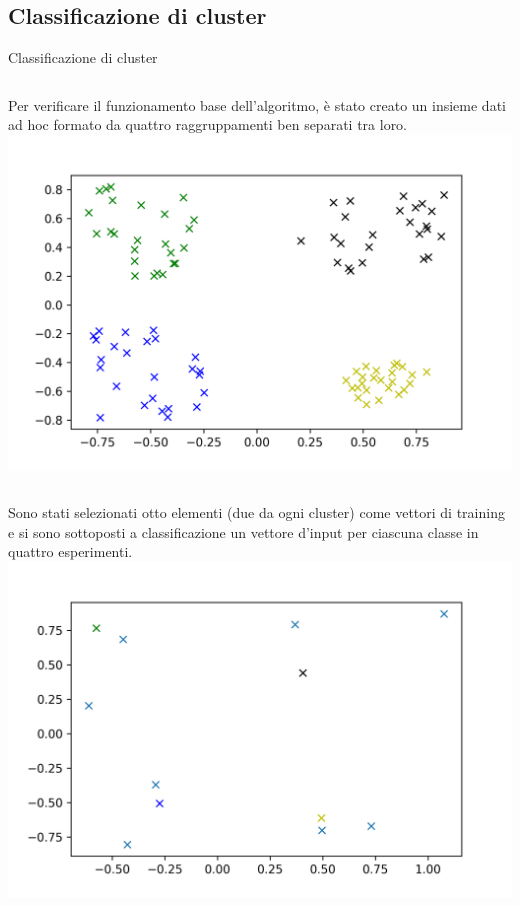 \documentclass{beamer}
\begin{document}
    \subsection{Classificazione di cluster}

    \begin{frame}{Classificazione di cluster}
        \begin{columns}
            Per verificare il funzionamento base dell'algoritmo, è stato creato un insieme dati ad hoc formato da quattro raggruppamenti ben separati tra loro. 
            \includegraphics[width=\columnwidth]{gfx/Clusters/cluster}
    \end{columns}

    \begin{columns}
        Sono stati selezionati otto elementi (due da ogni cluster) come vettori di training 
        e si sono sottoposti a classificazione un vettore d'input per ciascuna classe in quattro esperimenti. 
        \includegraphics[width=\columnwidth]{gfx/Clusters/random}            
    \end{columns}
    \end{frame}
\end{document}

